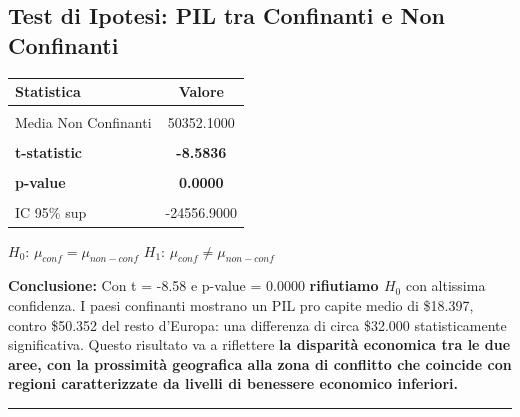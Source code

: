 \documentclass[
  letterpaper,
  DIV=11,
  numbers=noendperiod]{scrartcl}
\begin{document}
\subsection{Test di Ipotesi: PIL tra Confinanti e Non
Confinanti}\label{test-di-ipotesi-pil-tra-confinanti-e-non-confinanti}

\begin{table}[!h]
\centering\begingroup\fontsize{8}{10}\selectfont

\begin{tabular}{lc}
\toprule
Statistica & Valore\\
\midrule
\cellcolor{gray!10}{Media Confinanti} & \cellcolor{gray!10}{18397.6000}\\
Media Non Confinanti & 50352.1000\\
\cellcolor{gray!10}{Differenza} & \cellcolor{gray!10}{-31954.5000}\\
\textbf{t-statistic} & \textbf{-8.5836}\\
\textbf{\cellcolor{gray!10}{Gradi libertà}} & \textbf{\cellcolor{gray!10}{88.5000}}\\
\addlinespace
\textbf{p-value} & \textbf{0.0000}\\
\cellcolor{gray!10}{IC 95\% inf} & \cellcolor{gray!10}{-39352.1000}\\
IC 95\% sup & -24556.9000\\
\bottomrule
\end{tabular}
\endgroup{}
\end{table}

\begin{center}
$H_0$: $\mu_{conf} = \mu_{non-conf}$ \quad $H_1$: $\mu_{conf} \neq \mu_{non-conf}$
\end{center}

\vspace{0.2cm}
\scriptsize

\textbf{Conclusione:} Con t = -8.58 e p-value = 0.0000
\textbf{rifiutiamo $H_0$} con altissima confidenza. I paesi confinanti
mostrano un PIL pro capite medio di \$18.397, contro \$50.352 del resto
d'Europa: una differenza di circa \$32.000 statisticamente
significativa. Questo risultato va a riflettere
\textcolor{beamer@main}{\textbf{la disparità economica tra le due aree, con la prossimità geografica alla zona di conflitto che coincide con regioni caratterizzate da livelli di benessere economico inferiori.}}

\begin{center}\rule{0.5\linewidth}{0.5pt}\end{center}
\end{document}
